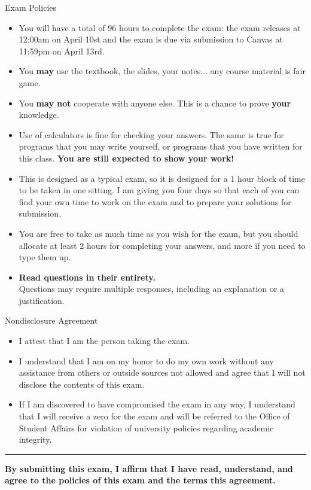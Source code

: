 \documentclass[12pt,addpoints,answers]{exam}
\begin{document}
\vspace*{0.25in}
\begin{center}\Large{Exam Policies}\end{center}
\begin{itemize}
\item You will have a total of 96 hours to complete the exam: the exam releases at 12:00am on April 10st and the exam is due via submission to Canvas at 11:59pm on April 13rd.
\item You \textbf{may} use the textbook, the slides, your notes... any course material is fair game.
\item You \textbf{may not} cooperate with anyone else. This is a chance to prove \textbf{your} knowledge.
\item Use of calculators is fine for checking your answers. The same is true for programs that you may write yourself, or programs that you have written for this class. \textbf{You are still expected to show your work!}
\item This is designed as a typical exam, so it is designed for a 1 hour block of time to be taken in one sitting. I am giving you four days so that each of you can find your own time to work on the exam and to prepare your solutions for submission.
\item You are free to take as much time as you wish for the exam, but you should allocate at least 2 hours for completing your answers, and more if you need to type them up.
\item \textbf{Read questions in their entirety.}\\Questions may require multiple responses, including an explanation or a justification.
\end{itemize}
\vfill
\begin{center}\Large{Nondisclosure Agreement}\end{center}
\begin{itemize}
\item I attest that I am the person taking the exam.
\item I understand that I am on my honor to do my own work without any assistance from others or outside sources not allowed and agree that I will not disclose the contents of this exam.
\item If I am discovered to have compromised the exam in any way, I understand that I will receive a zero for the exam and will be referred to the Office of Student Affairs for violation of university policies regarding academic integrity.
\end{itemize}
\vspace*{0.25in}
\hrule
\vspace*{0.25in}
\textbf{By submitting this exam, I affirm that I have read, understand, and agree to the policies of this exam and the terms this agreement.}
\vspace*{0.25in}
\newpage
\end{document}
